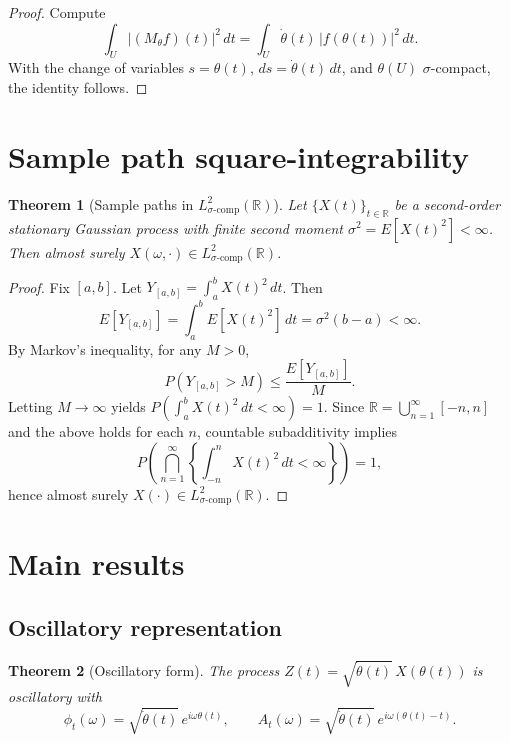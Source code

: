 \documentclass{article}
\newtheorem{theorem}{Theorem}[section]
\begin{document}
\begin{proof}
Compute
\[
\int_U |(M_\theta f)(t)|^2\, dt
= \int_U \dot{\theta}(t)\, |f(\theta(t))|^2\, dt.
\]
With the change of variables $s=\theta(t)$, $ds=\dot{\theta}(t)\,dt$, and $\theta(U)$ $\sigma$-compact, the identity follows.
\end{proof}

\section{Sample path square-integrability}

\begin{theorem}[Sample paths in $L^2_{\sigma\text{-comp}}(\mathbb{R})$]\label{thm:sample_paths_in_L2sigma}
Let $\{X(t)\}_{t\in\mathbb{R}}$ be a second-order stationary Gaussian process with finite second moment $\sigma^2=E[X(t)^2]<\infty$. Then almost surely $X(\omega,\cdot)\in L^2_{\sigma\text{-comp}}(\mathbb{R})$.
\end{theorem}

\begin{proof}
Fix $[a,b]$. Let $Y_{[a,b]}=\int_a^b X(t)^2\,dt$. Then
\[
E[Y_{[a,b]}]=\int_a^b E[X(t)^2]\,dt=\sigma^2(b-a)<\infty.
\]
By Markov's inequality, for any $M>0$,
\[
P\left(Y_{[a,b]}>M\right)\le \frac{E[Y_{[a,b]}]}{M}.
\]
Letting $M\to\infty$ yields $P\left(\int_a^b X(t)^2\,dt<\infty\right)=1$. Since $\mathbb{R}=\bigcup_{n=1}^\infty [-n,n]$ and the above holds for each $n$, countable subadditivity implies
\[
P\left(\bigcap_{n=1}^\infty \left\{\int_{-n}^n X(t)^2\,dt<\infty\right\}\right)=1,
\]
hence almost surely $X(\cdot)\in L^2_{\sigma\text{-comp}}(\mathbb{R})$.
\end{proof}

\section{Main results}

\subsection{Oscillatory representation}

\begin{theorem}[Oscillatory form]\label{thm:osc_rep}
The process $Z(t)=\sqrt{\dot{\theta}(t)}\,X(\theta(t))$ is oscillatory with
\[
\phi_t(\omega)=\sqrt{\dot{\theta}(t)}\, e^{i\omega \theta(t)},\qquad
A_t(\omega)=\sqrt{\dot{\theta}(t)}\, e^{i\omega(\theta(t)-t)}.
\]
\end{theorem}
\end{document}
